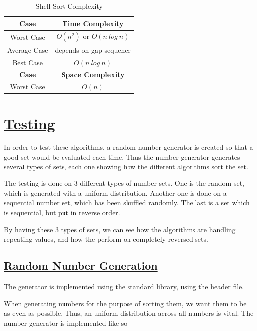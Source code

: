\documentclass{article}
\newcommand{\code}[1]{\codeinline{\texttt{#1}}}
\begin{document}
\begin{table}[H]
  \begin{center}
    \label{tab:Shell Sort Complexity}
    \begin{tabular}{c|c}
      \toprule
      \textbf{Case} & \textbf{Time Complexity} \\
      \midrule
      Worst Case & $O(n^2)$ or $O(n\ log\ n)$ \\
      Average Case & depends on gap sequence \\
      Best Case & $O(n\ log\ n)$ \\
      \bottomrule
      \toprule
      \textbf{Case} & \textbf{Space Complexity} \\
      \midrule
      Worst Case & $O(n)$ \\
    \end{tabular}
    \caption{Shell Sort Complexity}
  \end{center}
\end{table}

\section{\underline{Testing}}

In order to test these algorithms, a random number generator is created so that a good set would be evaluated each time. Thus the number generator generates several types of sets, each one showing how the different algorithms sort the set.

The testing is done on 3 different types of number sets. One is the random set, which is generated with a uniform distribution. Another one is done on a sequential number set, which has been shuffled randomly. The last is a set which is sequential, but put in reverse order.

By having these 3 types of sets, we can see how the algorithms are handling repeating values, and how the perform on completely reversed sets.

\subsection{\underline{Random Number Generation}}

The generator is implemented using the standard \code{C++} library, using the \code{<random>} header file.

When generating numbers for the purpose of sorting them, we want them to be as even as possible. Thus, an uniform distribution across all numbers is vital. The number generator is implemented like so:
\end{document}

